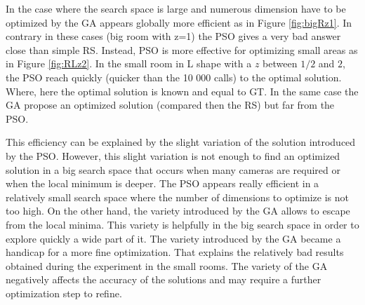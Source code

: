In the case where the search space is large and numerous dimension have to be optimized by the GA appears globally more efficient as in Figure \ref{fig:bigRz1}. In contrary in these cases (big room with z=1) the PSO gives a very bad answer close than simple RS.
 Instead, PSO is more effective for optimizing small areas as in Figure \ref{fig:RLz2}. In the small room in L shape with a $z$ between $1/2$ and $2$, the PSO reach quickly (quicker than the 10 000 calls) to the optimal solution. Where, here the optimal solution is known and equal to GT. In the same case the GA propose an optimized solution (compared then the RS) but far from the PSO.
 
 This efficiency can be explained by the slight variation of the solution introduced by the PSO. However, this slight variation is not enough to find an optimized solution in a big search space that occurs when many cameras are required or when the local minimum is deeper. The PSO appears really efficient in a relatively small search space where the number of dimensions to optimize is not too high.
 On the other hand, the variety  introduced by the GA allows to escape from  the local minima. This variety is helpfully  in the big search space in order to explore quickly a wide part of it. The variety introduced by the GA became a handicap for a more fine optimization. That explains the relatively bad results obtained during the experiment in the small rooms. The variety of the GA negatively affects the accuracy of the solutions and may require a further optimization step to refine. 
 
% 

